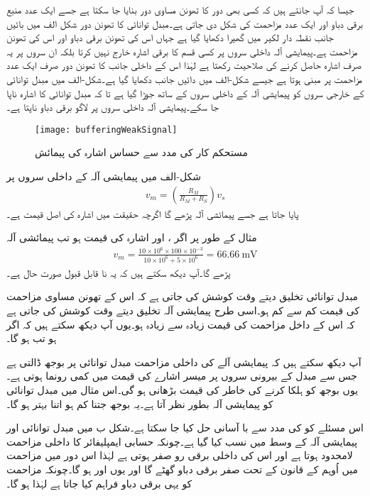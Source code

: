 	جیسا کہ آپ جانتے ہیں کہ کسی بھی دور کا تھونن  مساوی دور بنایا جا سکتا ہے جسے ایک عدد منبع برقی دباو اور ایک عدد مزاحمت کی شکل دی جاتی ہے۔مبدل توانائی کا تھونن دور شکل  الف میں بائیں جانب نقطہ دار لکیر میں گھیرا دکھایا گیا ہے جہاں  اس کی تھونن برقی دباو اور   اس کی تھونن مزاحمت ہے۔پیمایشی آلہ داخلی سروں پر کسی قسم کا برقی اشارہ خارج نہیں کرتا بلکہ ان سروں پر یہ صرف اشارہ حاصل کرنے کی صلاحیت رکھتا ہے لہٰذا اس کے داخلی جانب کا تھونن دور صرف ایک عدد مزاحمت   پر مبنی ہوتا ہے جیسے شکل-الف میں دائیں جانب دکھایا گیا ہے۔شکل-الف میں مبدل توانائی کے خارجی سروں کو پیمایشی آلہ کے داخلی سروں کے ساتھ جوڑا گیا ہے تا کہ مبدل توانائی کا اشارہ  ناپا جا سکے۔پیمایشی آلہ داخلی سروں  پر لاگو برقی دباو  ناپتا ہے۔
\begin{figure}
\centering
\texttt{[image: bufferingWeakSignal]}
\caption{مستحکم کار کی مدد سے حساس اشارہ کی  پیمائش}
\label{شکل_وسطی_دور_حساس_اشارہ}
\end{figure}
شکل-الف میں پیمایشی آلہ کے داخلی سروں پر
\begin{align*}
v_m=\left(\frac{R_M }{R_M+R_S} \right) v_s
\end{align*}
پایا جاتا ہے جسے پیمائشی آلہ پڑھے گا  اگرچہ حقیقت میں اشارہ کی اصل قیمت   ہے۔

	مثال کے طور پر اگر ، اور اشارہ کی قیمت ہو تب پیمائشی آلہ
\begin{align*}
v_m = \frac{10 \times 10^{6} \times 100 \times 10^{-3}}{10 \times 10^{6}+5 \times 10^{6}}=\SI{66.66}{\milli \volt}
\end{align*}
پڑھے گا۔آپ دیکھ سکتے ہیں کہ یہ نا قابل قبول صورت حال ہے۔

مبدل توانائی تخلیق دیتے وقت کوشش کی جاتی ہے کہ اس کے تھونن مساوی مزاحمت  کی قیمت کم سے کم ہو۔اسی طرح پیمایشی آلہ تخلیق دیتے وقت کوشش کی جاتی ہے کہ اس کے داخل مزاحمت  کی قیمت زیادہ سے زیادہ ہو۔یوں آپ دیکھ سکتے ہیں کہ اگر  ہو تب  ہو گا۔

آپ دیکھ سکتے ہیں کہ پیمایشی آلے کی داخلی مزاحمت مبدل توانائی پر بوجھ ڈالتی ہے جس سے مبدل کے بیرونی سروں پر میسر اشارے کی قیمت میں کمی رونما ہوتی ہے۔یوں بوجھ کو ہلکا کرنے کی خاطر  کی قیمت بڑھانی ہو گی۔اس مثال میں مبدل توانائی کو پیمایشی آلہ بطور    نظر آتا ہے۔یہ بوجھ جتنا کم ہو اتنا بہتر ہو گا۔

اس مسئلے کو  کی مدد سے با آسانی حل کیا جا سکتا ہے۔شکل  ب میں مبدل توانائی اور پیمایشی آلہ کے وسط میں  نسب کیا گیا ہے۔چونکہ حسابی ایمپلیفائر کا داخلی مزاحمت لامحدود ہوتا ہے اور اس کی داخلی برقی رو صفر ہوتی ہے لہٰذا اس دور میں مزاحمت  میں اُوہم کے قانون کے تحت صفر برقی دباو گھٹے گا اور یوں   اور   ہو گا۔چونکہ مزاحمت  کو یہی برقی دباو فراہم کیا جاتا ہے لہٰذا  ہو گا۔


